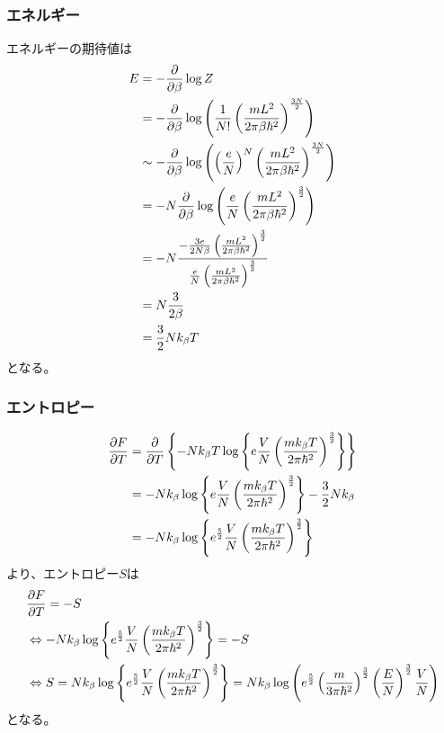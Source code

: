\documentclass[dvipdfmx, 11pt, a4paper]{jsarticle}
\theoremstyle{definition}
\begin{document}
\subsubsection{エネルギー}
    エネルギーの期待値は
    \begin{align}
        E &= -\frac{\partial }{\partial \beta} \log Z \notag \\
        &= -\frac{\partial }{\partial \beta} \log \left( \frac{1}{N!} \left( \frac{mL^2}{2\pi \beta \hbar^2 } \right)^{\frac{3N}{2}} \right) \notag \\
        &\sim -\frac{\partial }{\partial \beta} \log \left( \left( \frac{e}{N} \right)^N \left( \frac{mL^2}{2\pi \beta \hbar^2 } \right)^{\frac{3N}{2}} \right) \notag \\
        &= -N\frac{\partial }{\partial \beta} \log \left( \frac{e}{N} \left( \frac{mL^2}{2\pi \beta \hbar^2 } \right)^{\frac{3}{2}} \right) \notag \\
        &= -N \frac{-\frac{3e}{2N \beta} \left( \frac{mL^2}{2\pi \beta \hbar^2 } \right)^{\frac{3}{2}}}{\frac{e}{N} \left( \frac{mL^2}{2\pi \beta \hbar^2 } \right)^{\frac{3}{2}}} \notag \\
        &= N \frac{3}{2 \beta} \notag \\
        &= \frac{3}{2} Nk_\beta T
    \end{align}
    となる。
\subsubsection{エントロピー}
    \begin{align}
        \frac{\partial F}{\partial T} &= \frac{\partial }{\partial T} \left\{ -Nk_\beta T \log \left\{ e\frac{V}{N} \left( \frac{mk_\beta T}{2\pi \hbar^2 } \right)^{\frac{3}{2}} \right\} \right\} \notag \\
        &= -Nk_\beta \log \left\{ e\frac{V}{N} \left( \frac{mk_\beta T}{2\pi \hbar^2 } \right)^{\frac{3}{2}} \right\} -\frac{3}{2}Nk_\beta \notag \\
        &= -Nk_\beta \log \left\{ e^\frac{5}{2}\frac{V}{N} \left( \frac{mk_\beta T}{2\pi \hbar^2 } \right)^{\frac{3}{2}} \right\} 
    \end{align}
    より、エントロピー$S$は
    \begin{align}
        &\frac{\partial F}{\partial T} = -S \notag \\
        &\Leftrightarrow -Nk_\beta \log \left\{ e^\frac{5}{2}\frac{V}{N} \left( \frac{mk_\beta T}{2\pi \hbar^2 } \right)^{\frac{3}{2}} \right\} = -S \notag \\
        &\Leftrightarrow S = Nk_\beta \log \left\{ e^\frac{5}{2}\frac{V}{N} \left( \frac{mk_\beta T}{2\pi \hbar^2 } \right)^{\frac{3}{2}} \right\} = Nk_\beta \log \left( e^{\frac{5}{2}} \left(\frac{m}{3 \pi \hbar^2} \right)^{\frac{3}{2}} \left( \frac{E}{N} \right)^{\frac{3}{2}} \frac{V}{N} \right)
    \end{align}
    となる。
\end{document}
